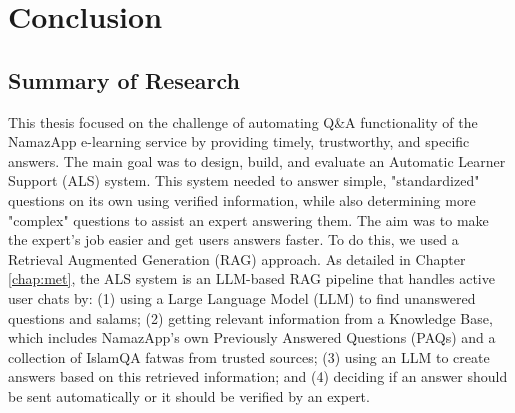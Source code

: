 \chapter{Conclusion}
\label{chap:conclusion}
\section{Summary of Research}
\label{sec:summary_of_research}
This thesis focused on the challenge of automating Q\&A functionality of the NamazApp e-learning service by providing timely, trustworthy, and specific answers. The main goal was to design, build, and evaluate an Automatic Learner Support (ALS) system. This system needed to answer simple, "standardized" questions on its own using verified information, while also determining more "complex" questions to assist an expert answering them. The aim was to make the expert's job easier and get users answers faster.
To do this, we used a Retrieval Augmented Generation (RAG) approach. As detailed in Chapter \ref{chap:met}, the ALS system is an LLM-based RAG pipeline that handles active user chats by: (1) using a Large Language Model (LLM) to find unanswered questions and salams; (2) getting relevant information from a Knowledge Base, which includes NamazApp's own Previously Answered Questions (PAQs) and a collection of IslamQA fatwas from trusted sources; (3) using an LLM to create answers based on this retrieved information; and (4) deciding if an answer should be sent automatically or it should be verified by an expert.
